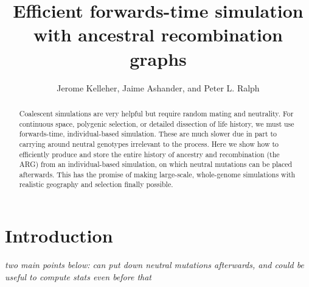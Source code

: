 \documentclass{article}
\newcommand{\plr}[1]{{\em \color{blue} #1}}
\begin{document}
\title{Efficient forwards-time simulation with ancestral recombination graphs}
\author{Jerome Kelleher, 
        Jaime Ashander, and
        Peter L. Ralph}
\maketitle


\begin{abstract}
Coalescent simulations are very helpful but require random mating and neutrality.
For continuous space, polygenic selection, or detailed dissection of life history, 
we must use forwards-time, individual-based simulation.
These are much slower due in part to carrying around neutral genotypes irrelevant to the process.
Here we show how to efficiently produce and store the entire history of ancestry and recombination
(the ARG) from an individual-based simulation,
on which neutral mutations can be placed afterwards.
This has the promise of making large-scale, whole-genome simulations with realistic geography and selection finally possible.
\end{abstract}


\section*{Introduction}

\plr{two main points below: can put down neutral mutations afterwards, and could be useful to compute stats even before that}
\end{document}
